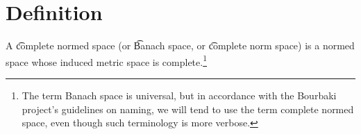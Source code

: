 

\section*{Definition}

A \t{complete normed space} (or \t{Banach space}, or \t{complete norm space}) is a normed space whose induced metric space is complete.\footnote{The term Banach space is universal, but in accordance with the Bourbaki project's guidelines on naming, we will tend to use the term complete normed space, even though such terminology is more verbose.}

\blankpage